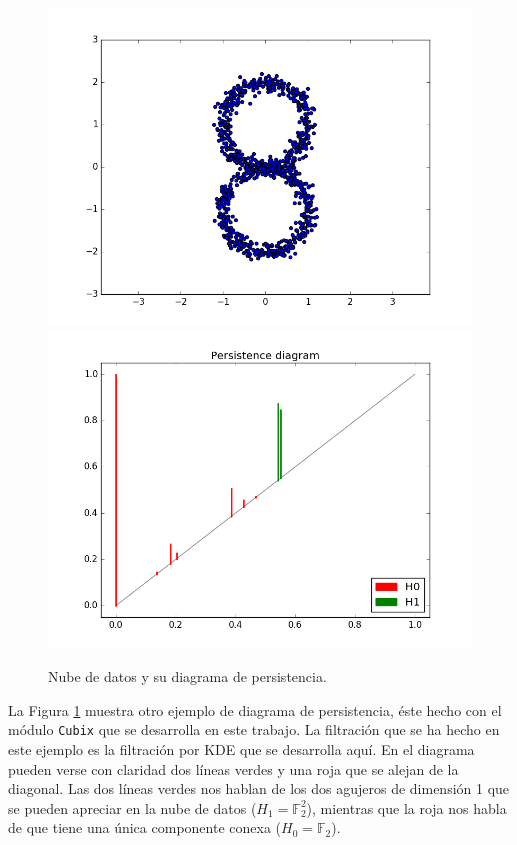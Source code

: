\documentclass[12pt,a4paper,twoside]{article} %
\theoremstyle{plain}
\theoremstyle{definition}
\newcommand{\F}{\mathbb{F}}
\begin{document}
\begin{figure}[h!]
\centering
\includegraphics[scale=0.40]{img/s1vs1.png}
\includegraphics[scale=0.40]{img/cubex_diagram.png}
\caption{Nube de datos y su diagrama de persistencia.}
\label{diagram_cubex}
\end{figure}

La Figura \ref{diagram_cubex} muestra otro ejemplo de diagrama de persistencia, éste hecho con el módulo \texttt{Cubix} que se desarrolla en este trabajo. La filtración que se ha hecho en este ejemplo es la filtración por KDE que se desarrolla aquí. En el diagrama pueden verse con claridad dos líneas verdes y una roja que se alejan de la diagonal. Las dos líneas verdes nos hablan de los dos agujeros de dimensión 1 que se pueden apreciar en la nube de datos ($H_1=\F_2^2$), mientras que la roja nos habla de que tiene una única componente conexa ($H_0=\F_2$).
\end{document}
